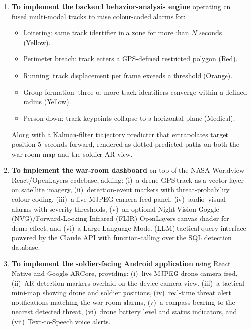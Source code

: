 \begin{enumerate}[label=\textbf{O\arabic*.}, leftmargin=*, itemsep=4pt]
    \item \textbf{To implement the backend behavior-analysis engine} operating on fused multi-modal tracks to raise colour-coded alarms for:
    \begin{itemize}
        \item Loitering: same track identifier in a zone for more than $N$ seconds (Yellow).
        \item Perimeter breach: track enters a GPS-defined restricted polygon (Red).
        \item Running: track displacement per frame exceeds a threshold (Orange).
        \item Group formation: three or more track identifiers converge within a defined radius (Yellow).
        \item Person-down: track keypoints collapse to a horizontal plane (Medical).
    \end{itemize}
    Along with a Kalman-filter trajectory predictor that extrapolates target position 5~seconds forward, rendered as dotted predicted paths on both the war-room map and the soldier AR view.

    \item \textbf{To implement the war-room dashboard} on top of the NASA Worldview React/OpenLayers codebase, adding: (i)~a drone GPS track as a vector layer on satellite imagery, (ii)~detection-event markers with threat-probability colour coding, (iii)~a live MJPEG camera-feed panel, (iv)~audio--visual alarms with severity thresholds, (v)~an optional Night-Vision-Goggle (NVG)/Forward-Looking Infrared (FLIR) OpenLayers canvas shader for demo effect, and (vi)~a Large Language Model (LLM) tactical query interface powered by the Claude API with function-calling over the SQL detection database.

    \item \textbf{To implement the soldier-facing Android application} using React Native and Google ARCore, providing: (i)~live MJPEG drone camera feed, (ii)~AR detection markers overlaid on the device camera view, (iii)~a tactical mini-map showing drone and soldier positions, (iv)~real-time threat alert notifications matching the war-room alarms, (v)~a compass bearing to the nearest detected threat, (vi)~drone battery level and status indicators, and (vii)~Text-to-Speech voice alerts.


\end{enumerate}
